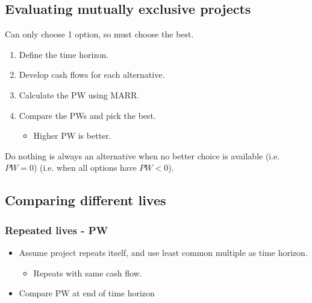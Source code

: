 \subsection{Evaluating mutually exclusive projects}
Can only choose 1 option, so must choose the best.
\begin{process}
    \begin{enumerate}
        \item Define the time horizon.
        
        \item Develop cash flows for each alternative.
        
        \item Calculate the PW using MARR.
        
        \item Compare the PWs and pick the best.
            \begin{itemize}
                \item Higher PW is better.
            \end{itemize}
    \end{enumerate}
\end{process}

\begin{warning}
    Do nothing is always an alternative when no better choice is available (i.e. $PW=0$) (i.e. when all options have $PW<0$).
\end{warning}

\begin{example}
\end{example}

\subsection{Comparing different lives}

\subsubsection{Repeated lives - PW}
\begin{definition}
    \begin{itemize}
        \item Assume project repeats itself, and use least common multiple as time horizon. 
        \begin{itemize}
            \item Repeats with same cash flow.
        \end{itemize}
        \item Compare PW at end of time horizon
    \end{itemize}
\end{definition}

